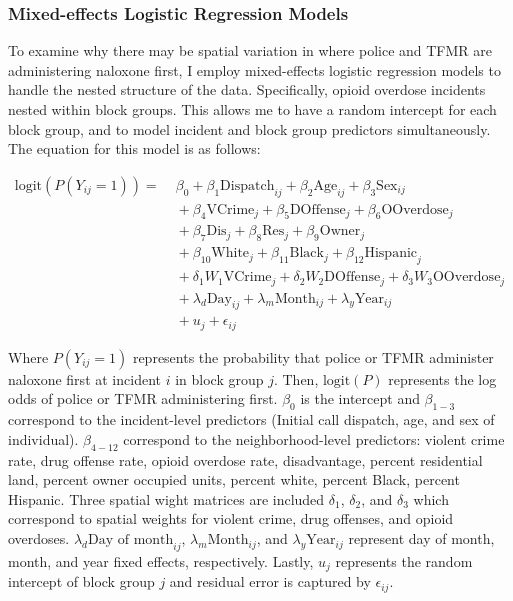 \subsubsection{Mixed-effects Logistic Regression Models}
To examine why there may be spatial variation in where police and TFMR are administering naloxone first, I employ mixed-effects logistic regression models to handle the nested structure of the data. Specifically, opioid overdose incidents nested within block groups. This allows me to have a random intercept for each block group, and to model incident and block group predictors simultaneously. The equation for this model is as follows:

\begin{align*}
   \text{logit}\left(P(Y_{ij} = 1)\right) = &\; \beta_0 + \beta_1 \text{Dispatch}_{ij} + \beta_2 \text{Age}_{ij} + \beta_3 \text{Sex}_{ij} \\
&\; + \beta_4 \text{VCrime}_{j} + \beta_5 \text{DOffense}_{j} + \beta_6 \text{OOverdose}_{j} \\
&\; + \beta_7 \text{Dis}_{j} + \beta_8 \text{Res}_{j} + \beta_9 \text{Owner}_{j} \\
&\; + \beta_{10} \text{White}_{j} + \beta_{11} \text{Black}_{j} + \beta_{12} \text{Hispanic}_{j} \\
&\; + \delta_1 W_1 \text{VCrime}_{j} + \delta_2 W_2 \text{DOffense}_{j} + \delta_3 W_3 \text{OOverdose}_{j} \\
&\; + \lambda_d \text{Day}_{ij} + \lambda_m \text{Month}_{ij} + \lambda_y \text{Year}_{ij} \\
&\; + u_j + \epsilon_{ij}  
\end{align*}

\noindent Where \(P(Y_{ij} = 1)\) represents the probability that police or TFMR administer naloxone first at incident \(i\) in block group \(j\). Then, \(\text{logit}(P)\) represents the log odds of police or TFMR administering first. \(\beta_0\) is the intercept and \(\beta_{1-3}\) correspond to the incident-level predictors (Initial call dispatch, age, and sex of individual). \(\beta_{4-12}\) correspond to the neighborhood-level predictors: violent crime rate, drug offense rate, opioid overdose rate, disadvantage, percent residential land, percent owner occupied units, percent white, percent Black, percent Hispanic. Three spatial wight matrices are included \(\delta_1\), \(\delta_2\), and \(\delta_3\) which correspond to spatial weights for violent crime, drug offenses, and opioid overdoses. \(\lambda_d \text{Day of month}_{ij}\), \(\lambda_m \text{Month}_{ij}\), and \(\lambda_y \text{Year}_{ij}\) represent day of month, month, and year fixed effects, respectively. Lastly, \(u_j\) represents the random intercept of block group \(j\) and residual error is captured by \(\epsilon_{ij}\).

